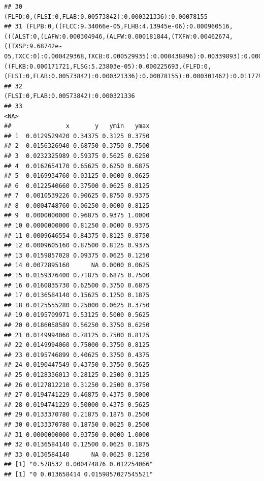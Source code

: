 \documentclass[]{article}
\begin{document}
\begin{verbatim}
## 30                                                                                                                                                                                                                                                                                                                                                          (FLFD:0,(FLSI:0,FLAB:0.00573842):0.000321336):0.00078155
## 31 (FLPB:0,((FLCC:9.34066e-05,FLHB:4.13945e-06):0.000960516,(((ALST:0,(LAFW:0.000304946,(ALFW:0.000181844,(TXFW:0.00462674,((TXSP:9.68742e-05,TXCC:0):0.000429368,TXCB:0.000529935):0.000438896):0.00339893):0.000450879):0.000633288):0.00274534,((FLKB:0.000171721,FLSG:5.23803e-05):0.000225693,(FLFD:0,(FLSI:0,FLAB:0.00573842):0.000321336):0.00078155):0.000301462):0.0117792,FLLG:0.0165186):0.000474876):0);
## 32                                                                                                                                                                                                                                                                                                                                                                              (FLSI:0,FLAB:0.00573842):0.000321336
## 33                                                                                                                                                                                                                                                                                                                                                                                                              <NA>
##               x       y   ymin   ymax
## 1  0.0129529420 0.34375 0.3125 0.3750
## 2  0.0156326940 0.68750 0.3750 0.7500
## 3  0.0232325989 0.59375 0.5625 0.6250
## 4  0.0162654170 0.65625 0.6250 0.6875
## 5  0.0169934760 0.03125 0.0000 0.0625
## 6  0.0122540660 0.37500 0.0625 0.8125
## 7  0.0010539226 0.90625 0.8750 0.9375
## 8  0.0004748760 0.06250 0.0000 0.8125
## 9  0.0000000000 0.96875 0.9375 1.0000
## 10 0.0000000000 0.81250 0.0000 0.9375
## 11 0.0009646554 0.84375 0.8125 0.8750
## 12 0.0009605160 0.87500 0.8125 0.9375
## 13 0.0159857028 0.09375 0.0625 0.1250
## 14 0.0072895160      NA 0.0000 0.0625
## 15 0.0159376400 0.71875 0.6875 0.7500
## 16 0.0160835730 0.62500 0.3750 0.6875
## 17 0.0136584140 0.15625 0.1250 0.1875
## 18 0.0125555280 0.25000 0.0625 0.3750
## 19 0.0195709971 0.53125 0.5000 0.5625
## 20 0.0186058589 0.56250 0.3750 0.6250
## 21 0.0149994060 0.78125 0.7500 0.8125
## 22 0.0149994060 0.75000 0.3750 0.8125
## 23 0.0195746899 0.40625 0.3750 0.4375
## 24 0.0190447549 0.43750 0.3750 0.5625
## 25 0.0128336013 0.28125 0.2500 0.3125
## 26 0.0127812210 0.31250 0.2500 0.3750
## 27 0.0194741229 0.46875 0.4375 0.5000
## 28 0.0194741229 0.50000 0.4375 0.5625
## 29 0.0133370780 0.21875 0.1875 0.2500
## 30 0.0133370780 0.18750 0.0625 0.2500
## 31 0.0000000000 0.93750 0.0000 1.0000
## 32 0.0136584140 0.12500 0.0625 0.1875
## 33 0.0136584140      NA 0.0625 0.1250
## [1] "0.578532 0.000474876 0.012254066"
## [1] "0 0.013658414 0.0159857027545521"
\end{verbatim}
\end{document}
